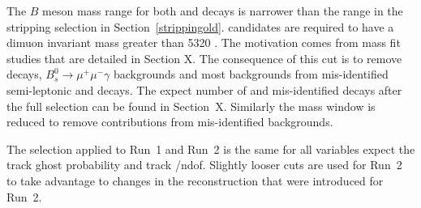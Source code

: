 The $B$ meson mass range for both \bsmumu and \bhh decays is narrower than the range in the stripping selection in Section~\ref{strippingold}. \bsmumu candidates are required to have a dimuon invariant mass greater than 5320 \mevcc. The motivation comes from mass fit studies that are detailed in Section X. The consequence of this cut is to remove \bdmumu decays, $B_{s}^{0} \to \mu^{+} \mu^{-} \gamma$ backgrounds and most backgrounds from mis-identified semi-leptonic and \bhh decays. The expect number of \bdmumu and mis-identified decays after the full selection can be found in Section~X. Similarly the \bhh mass window is reduced to remove contributions from mis-identified backgrounds. 

The selection applied to Run~1 and Run~2 is the same for all variables expect the track ghost probability and track \chisqd/ndof. Slightly looser cuts are used for Run~2 to take advantage to changes in the reconstruction that were introduced for Run~2. 

